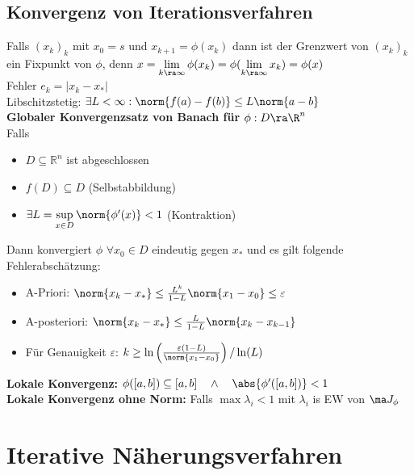 \documentclass[fs, footer]{latex4ei}
\begin{document}
\begin{multicols*}{4}
{		\subsection{Konvergenz von Iterationsverfahren}
	Falls $(x_k)_k$ mit $x_0 = s$ und $x_{k+1} = \phi(x_k)$ dann ist der Grenzwert von $(x_k)_k$ ein Fixpunkt von $\phi$,
	denn $x = \lim\limits_{k \ra \infty} \phi(x_k) = \phi(\lim\limits_{k \ra \infty} x_k) = \phi(x)$\\
	Fehler $e_k = |x_k - x_*|$\\
	Libschitzstetig: $\exists L < \infty:\norm{f(a)-f(b)} \le L \norm{a-b}$\\
	\textbf{Globaler Konvergenzsatz von Banach für $\phi:D\ra\R^n$} \\
	Falls \begin{itemize}\itemsep0pt
		\item $D \subseteq \mathbb R^n$ ist abgeschlossen
		\item $f(D) \subseteq D$ (Selbstabbildung)
		\item $\exists L = \sup\limits_{x\in D} \norm{\phi'(x)} < 1$ \quad (Kontraktion)\\
	\end{itemize}
	Dann konvergiert $\phi$ $\forall x_0 \in D$ eindeutig gegen $x_*$ und es gilt folgende Fehlerabschätzung:
	\begin{itemize}\itemsep1pt
		\item A-Priori: $\norm{x_k - x_*} \le \frac{L^k}{1 - L} \norm{x_1 -x_0} \le \varepsilon$
		\item A-posteriori: $\norm{x_k - x_*} \le \frac{L}{1 - L} \norm{x_k -x_{k-1}}$
		\item Für Genauigkeit $\varepsilon$: $k \ge \ln\left( \frac{\varepsilon(1-L)}{\norm{x_1 -x_0}}\right) / \ln(L)$
	\end{itemize}
	\textbf{Lokale Konvergenz:} $\phi([a,b]) \subseteq [a,b] \quad \land \quad \abs{\phi'([a,b])} < 1$\\
	\textbf{Lokale Konvergenz ohne Norm:} Falls $\max{\lambda_i} < 1$ mit $\lambda_i$ is EW von $\ma J_\phi$\\
	} 
	
\section{Iterative Näherungsverfahren}
\sectionbox{
}
\end{multicols*}
\end{document}
